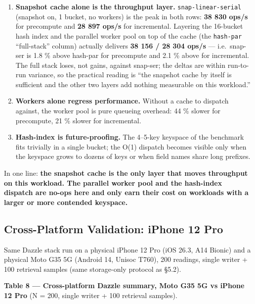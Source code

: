 \begin{enumerate}
\def\labelenumi{\arabic{enumi}.}
\tightlist
\item
  \textbf{Snapshot cache alone is the throughput layer.}
  \texttt{snap-linear-serial} (snapshot on, 1 bucket, no workers) is the peak in
  both rows: \textbf{38 830 ops/s} for precompute and \textbf{28 897 ops/s} for
  incremental. Layering the 16-bucket hash index and the parallel worker pool on
  top of the cache (the \texttt{hash-par} ``full-stack'' column) actually
  delivers \textbf{38 156 / 28 304 ops/s} --- i.e.~snap-ser is 1.8 \% above
  hash-par for precompute and 2.1 \% above for incremental. The full stack
  loses, not gains, against snap-ser; the deltas are within run-to-run variance,
  so the practical reading is ``the snapshot cache by itself is sufficient and
  the other two layers add nothing measurable on this workload.''
\item
  \textbf{Workers alone regress performance.} Without a cache to dispatch
  against, the worker pool is pure queueing overhead: 44 \% slower for
  precompute, 21 \% slower for incremental.
\item
  \textbf{Hash-index is future-proofing.} The 4--5-key keyspace of the benchmark
  fits trivially in a single bucket; the O(1) dispatch becomes visible only when
  the keyspace grows to dozens of keys or when field names share long prefixes.
\end{enumerate}

In one line: \textbf{the snapshot cache is the only layer that moves throughput
on this workload. The parallel worker pool and the hash-index dispatch are
no-ops here and only earn their cost on workloads with a larger or more
contended keyspace.}

\subsection{Cross-Platform Validation: iPhone 12
Pro}\label{cross-platform-validation-iphone-12-pro}

Same Dazzle stack run on a physical iPhone 12 Pro (iOS 26.3, A14 Bionic) and a
physical Moto G35 5G (Android 14, Unisoc T760), 200 readings, single writer +
100 retrieval samples (same storage-only protocol as §5.2).

\textbf{Table 8 --- Cross-platform Dazzle summary, Moto G35 5G vs iPhone 12 Pro}
(N = 200, single writer + 100 retrieval samples).

